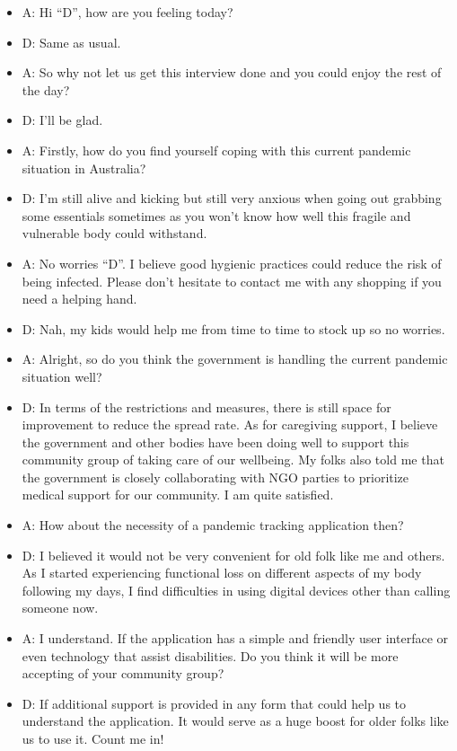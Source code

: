   \begin{itemize}
    \item A: Hi “D”, how are you feeling today?
    \item D: Same as usual.
    \item A: So why not let us get this interview done and you could enjoy the rest of the day?
    \item D: I’ll be glad.
    \item A: Firstly, how do you find yourself coping with this current pandemic situation in Australia?
    \item D: I’m still alive and kicking but still very anxious when going out grabbing some essentials
    sometimes as you won’t know how well this fragile and vulnerable body could withstand.
    \item A: No worries “D”. I believe good hygienic practices could reduce the risk of being infected.
    Please don’t hesitate to contact me with any shopping if you need a helping hand.
    \item D: Nah, my kids would help me from time to time to stock up so no worries.
    \item A: Alright, so do you think the government is handling the current pandemic situation well?
    \item D: In terms of the restrictions and measures, there is still space for improvement to reduce the
    spread rate. As for caregiving support, I believe the government and other bodies have been
    doing well to support this community group of taking care of our wellbeing. My folks also
    told me that the government is closely collaborating with NGO parties to prioritize medical
    support for our community. I am quite satisfied.
    \item A: How about the necessity of a pandemic tracking application then?
    \item D: I believed it would not be very convenient for old folk like me and others. As I started
    experiencing functional loss on different aspects of my body following my days, I find
    difficulties in using digital devices other than calling someone now.
    \item A: I understand. If the application has a simple and friendly user interface or even technology
    that assist disabilities. Do you think it will be more accepting of your community group?
    \item D: If additional support is provided in any form that could help us to understand the application.
    It would serve as a huge boost for older folks like us to use it. Count me in!

\end{itemize}
